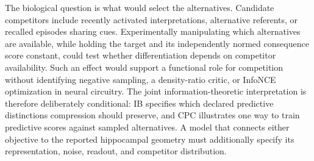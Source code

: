 \documentclass[11pt]{article}
\begin{document}
The biological question is what would select the alternatives. Candidate
competitors include recently activated interpretations, alternative
referents, or recalled episodes sharing cues. Experimentally
manipulating which alternatives are available, while holding the target
and its independently normed consequence score constant, could test
whether differentiation depends on competitor availability. Such an
effect would support a functional role for competition without
identifying negative sampling, a density-ratio critic, or InfoNCE
optimization in neural circuitry. The joint information-theoretic
interpretation is therefore deliberately conditional: IB specifies which
declared predictive distinctions compression should preserve, and CPC
illustrates one way to train predictive scores against sampled
alternatives. A model that connects either objective to the reported
hippocampal geometry must additionally specify its representation,
noise, readout, and competitor distribution.
\clearpage
\end{document}
